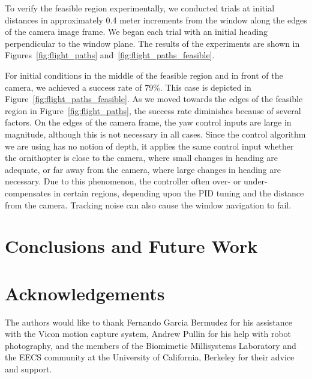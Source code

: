 \documentclass{aamas2013}
\begin{document}
To verify the feasible region experimentally, we conducted trials at initial
distances in approximately 0.4 meter increments from the window along the
edges of the camera image frame. We began each trial with an initial heading
perpendicular to the window plane. The results of the experiments are shown in
Figures~\ref{fig:flight_paths} and~\ref{fig:flight_paths_feasible}.

For initial conditions in the middle of the feasible region and in front of
the camera, we achieved a success rate of 79\%. This case is depicted in
Figure~\ref{fig:flight_paths_feasible}. As we moved towards the edges of the
feasible region in Figure~\ref{fig:flight_paths}, the success rate diminishes
because of several factors. On the edges of the camera frame, the yaw control
inputs are large in magnitude, although this is not necessary in all cases.
Since the control algorithm we are using has no notion of depth, it applies
the same control input whether the ornithopter is close to the camera, where
small changes in heading are adequate, or far away from the camera, where
large changes in heading are necessary. Due to this phenomenon, the controller
often over- or under-compensates in certain regions, depending upon the PID
tuning and the distance from the camera. Tracking noise can also cause the
window navigation to fail.

\section{Conclusions and Future Work}

\section{Acknowledgements}
The authors would like to thank Fernando Garcia Bermudez for his 
assistance with the Vicon motion capture system, Andrew Pullin for his 
help with robot photography, and the members of the Biomimetic 
Millisystems Laboratory and the EECS community at the University of 
California, Berkeley for their advice and support.





\end{document}

